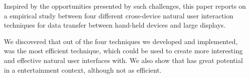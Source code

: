 Inspired by the opportunities presented by such challenges, this paper reports on a empirical study between four different cross-device natural user interaction techniques for data transfer between hand-held devices and large displays.

We discovered that out of the four techniques we developed and implemented, \swipe was the most efficient technique, which could be used to create more interesting and effective natural user interfaces with. We also show that \pinch has great potential in a entertainment context, although not as efficient. 


